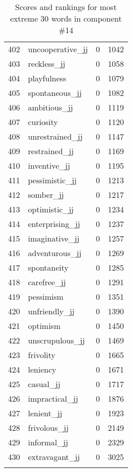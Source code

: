 \begin{longtable}[!htbp]{| rlr@{.}l |}
    402 & uncooperative\_jj & 0 & 1042 \\
    403 & reckless\_jj & 0 & 1058 \\
    404 & playfulness & 0 & 1079 \\
    405 & spontaneous\_jj & 0 & 1082 \\
    406 & ambitious\_jj & 0 & 1119 \\
    407 & curiosity & 0 & 1120 \\
    408 & unrestrained\_jj & 0 & 1147 \\
    409 & restrained\_jj & 0 & 1169 \\
    410 & inventive\_jj & 0 & 1195 \\
    411 & pessimistic\_jj & 0 & 1213 \\
    412 & somber\_jj & 0 & 1217 \\
    413 & optimistic\_jj & 0 & 1234 \\
    414 & enterprising\_jj & 0 & 1237 \\
    415 & imaginative\_jj & 0 & 1257 \\
    416 & adventurous\_jj & 0 & 1269 \\
    417 & spontaneity & 0 & 1285 \\
    418 & carefree\_jj & 0 & 1291 \\
    419 & pessimism & 0 & 1351 \\
    420 & unfriendly\_jj & 0 & 1390 \\
    421 & optimism & 0 & 1450 \\
    422 & unscrupulous\_jj & 0 & 1469 \\
    423 & frivolity & 0 & 1665 \\
    424 & leniency & 0 & 1671 \\
    425 & casual\_jj & 0 & 1717 \\
    426 & impractical\_jj & 0 & 1876 \\
    427 & lenient\_jj & 0 & 1923 \\
    428 & frivolous\_jj & 0 & 2149 \\
    429 & informal\_jj & 0 & 2329 \\
    430 & extravagant\_jj & 0 & 3025 \\
    \hline
    \caption{Scores and rankings for most extreme 30 words in component \#14} \\
\end{longtable}
